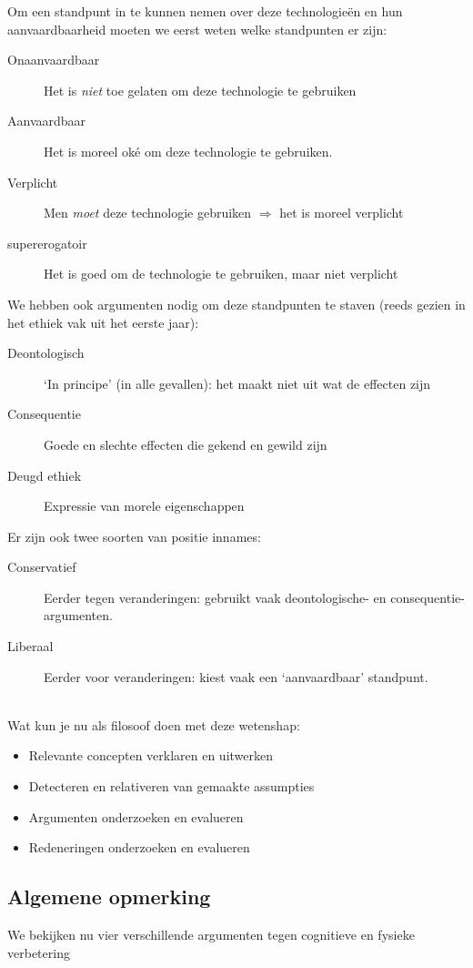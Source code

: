 \documentclass[../summary.tex]{subfiles}
\begin{document}
			Om een standpunt in te kunnen nemen over deze technologieën en hun aanvaardbaarheid moeten we eerst weten welke standpunten er zijn: 
			\begin{description}
				\item[Onaanvaardbaar] Het is \emph{niet} toe gelaten om deze technologie te gebruiken
				\item[Aanvaardbaar] Het is moreel oké om deze technologie te gebruiken. 
				\item[Verplicht] Men \emph{moet} deze technologie gebruiken $\Rightarrow$ het is moreel verplicht
				\item[supererogatoir] Het is goed om de technologie te gebruiken, maar niet verplicht
			\end{description} 
			We hebben ook argumenten nodig om deze standpunten te staven (reeds gezien in het ethiek vak uit het eerste jaar):
			\begin{description}
				\item[Deontologisch] `In principe' (in alle gevallen): het maakt niet uit wat de effecten zijn
				\item[Consequentie] Goede en slechte effecten die gekend en gewild zijn
				\item[Deugd ethiek] Expressie van morele eigenschappen
			\end{description}
			Er zijn ook twee soorten van positie innames:
			\begin{description}
				\item[Conservatief] Eerder tegen veranderingen: gebruikt vaak deontologische- en consequentie-argumenten.  
				\item[Liberaal] Eerder voor veranderingen: kiest vaak een `aanvaardbaar' standpunt. 
			\end{description}
			\mbox{}\\
			Wat kun je nu als filosoof doen met deze wetenshap: 
			\begin{itemize}
				\item Relevante concepten verklaren en uitwerken
				\item Detecteren en relativeren van gemaakte assumpties
				\item Argumenten onderzoeken en evalueren
				\item Redeneringen onderzoeken en evalueren
			\end{itemize}
		\subsection{Algemene opmerking}
			We bekijken nu vier verschillende argumenten tegen cognitieve en fysieke verbetering
\end{document}
